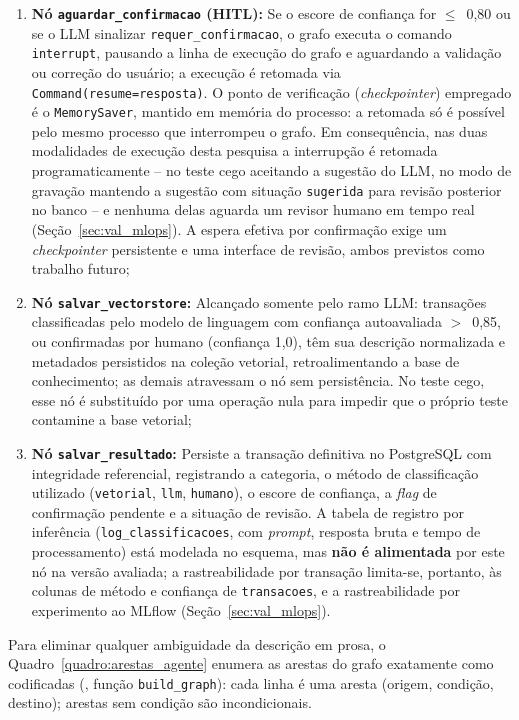 \begin{enumerate}
	\item \textbf{Nó \texttt{aguardar\_confirmacao} (HITL):} Se o escore de confiança for $\le$~0,80 ou se o LLM sinalizar \texttt{requer\_confirmacao}, o grafo executa o comando \texttt{interrupt}, pausando a linha de execução do grafo e aguardando a validação ou correção do usuário; a execução é retomada via \texttt{Command(resume=resposta)}. O ponto de verificação (\textit{checkpointer}) empregado é o \texttt{MemorySaver}, mantido em memória do processo: a retomada só é possível pelo mesmo processo que interrompeu o grafo. Em consequência, nas duas modalidades de execução desta pesquisa a interrupção é retomada programaticamente -- no teste cego aceitando a sugestão do LLM, no modo de gravação mantendo a sugestão com situação \texttt{sugerida} para revisão posterior no banco -- e nenhuma delas aguarda um revisor humano em tempo real (Seção~\ref{sec:val_mlops}). A espera efetiva por confirmação exige um \textit{checkpointer} persistente e uma interface de revisão, ambos previstos como trabalho futuro;
	\item \textbf{Nó \texttt{salvar\_vectorstore}:} Alcançado somente pelo ramo LLM: transações classificadas pelo modelo de linguagem com confiança autoavaliada $>$~0,85, ou confirmadas por humano (confiança 1,0), têm sua descrição normalizada e metadados persistidos na coleção vetorial, retroalimentando a base de conhecimento; as demais atravessam o nó sem persistência. No teste cego, esse nó é substituído por uma operação nula para impedir que o próprio teste contamine a base vetorial;
	\item \textbf{Nó \texttt{salvar\_resultado}:} Persiste a transação definitiva no PostgreSQL com integridade referencial, registrando a categoria, o método de classificação utilizado (\texttt{vetorial}, \texttt{llm}, \texttt{humano}), o escore de confiança, a \textit{flag} de confirmação pendente e a situação de revisão. A tabela de registro por inferência (\texttt{log\_classificacoes}, com \textit{prompt}, resposta bruta e tempo de processamento) está modelada no esquema, mas \textbf{não é alimentada} por este nó na versão avaliada; a rastreabilidade por transação limita-se, portanto, às colunas de método e confiança de \texttt{transacoes}, e a rastreabilidade por experimento ao MLflow (Seção~\ref{sec:val_mlops}).
\end{enumerate}

Para eliminar qualquer ambiguidade da descrição em prosa, o Quadro~\ref{quadro:arestas_agente} enumera as arestas do grafo exatamente como codificadas (, função \texttt{build\_graph}): cada linha é uma aresta (origem, condição, destino); arestas sem condição são incondicionais.


